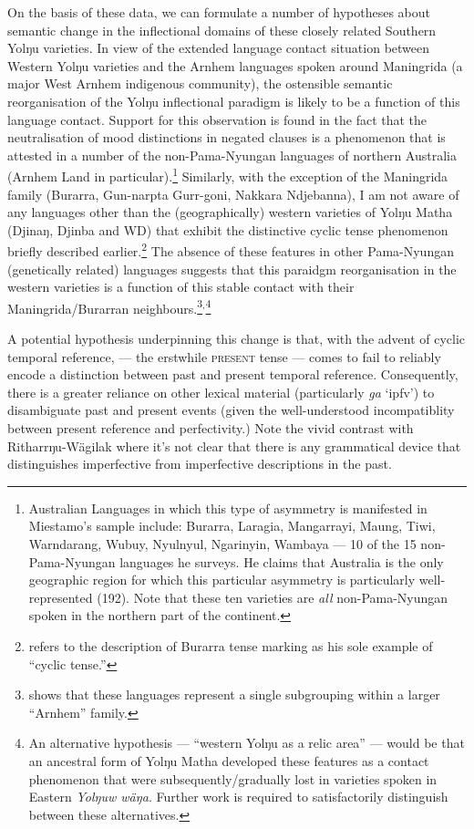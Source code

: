 On the basis of these data, we can formulate a number of hypotheses about semantic change in the inflectional domains of these closely related Southern Yolŋu varieties. In view of the extended language contact situation between Western Yolŋu varieties and the Arnhem languages spoken around Maningrida (a major West Arnhem indigenous community), the ostensible semantic reorganisation of the Yolŋu inflectional paradigm is likely to be a function of this language contact. Support for this observation is found in the fact that the neutralisation of mood distinctions in negated clauses is a phenomenon that is attested in a number of the non-Pama-Nyungan languages of northern Australia (Arnhem Land in particular).\footnote{Australian Languages in which this type of asymmetry is manifested  in Miestamo's \citeyearpar[411]{Miestamo2005} sample include: Burarra, Laragia, Mangarrayi, Maung, Tiwi, Warndarang, Wubuy, Nyulnyul, Ngarinyin, Wambaya --- 10 of the 15 non-Pama-Nyungan languages he surveys. He claims that Australia is the only geographic region for which this particular asymmetry is particularly well-represented (192). Note that these ten varieties are \textit{all}  non-Pama-Nyungan spoken in the northern part of the continent.} Similarly, with the exception of the Maningrida family (Burarra, Gun-narpta Gurr-goni, Nakkara Ndjebanna), I am not aware of any languages other than the (geographically) western varieties of Yolŋu Matha (Djinaŋ, Djinba and WD) that exhibit the distinctive cyclic tense phenomenon briefly described earlier.\footnote{\citet[75]{Comrie1985} refers to the description of Burarra tense marking \citep{Glasgow1964} as his sole example of ``cyclic tense.''} The absence of these features in other Pama-Nyungan (genetically related) languages suggests that this paraidgm reorganisation in the western varieties is a function of this stable contact with their Maningrida/Burarran neighbours.\footnote{\citet{Green2003} shows that these languages represent a single subgrouping within a larger ``Arnhem'' family.}$ ^, $\footnote{An alternative hypothesis --- ``western Yolŋu as a relic area'' --- would be that an ancestral form of Yolŋu Matha developed these features as a contact phenomenon that were subsequently/gradually lost in varieties spoken in Eastern \textit{Yolŋuw wäŋa}. Further work is required to satisfactorily distinguish between these alternatives.}



A potential hypothesis underpinning this change is that, with the advent of cyclic temporal reference, \I{} --- the erstwhile \textsc{present} tense --- comes to fail to reliably encode a distinction between past and present temporal reference. Consequently, there is a greater reliance on other lexical material (particularly \textit{ga} `\gls{ipfv}') to disambiguate past and present events (given the well-understood incompatiblity between present reference and perfectivity.) Note the vivid contrast with Ritharrŋu-Wägilak where it's not clear that there is any grammatical device that distinguishes imperfective from imperfective descriptions in the past.

